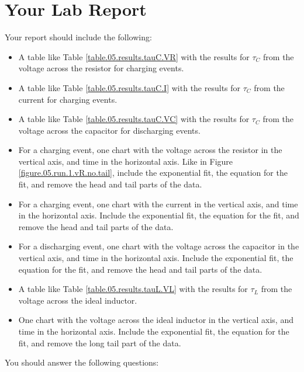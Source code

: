 \section{Your Lab Report}
%
Your report should include the following:
\begin{itemize}
    \item A table like Table \ref{table.05.results.tauC.VR} with the results for $\tau_{C}$ from the voltage across the resistor for charging events.
    \item A table like Table \ref{table.05.results.tauC.I} with the results for $\tau_{C}$ from the current for charging events.
    \item A table like Table \ref{table.05.results.tauC.VC} with the results for $\tau_{C}$ from the voltage across the capacitor for discharging events.
    \item For a charging event, one chart with the voltage across the resistor in the vertical axis, and time in the horizontal axis. Like in Figure \ref{figure.05.run.1.vR.no.tail}, include the exponential fit, the equation for the fit, and remove the head and tail parts of the data.
    \item For a charging event, one chart with the current in the vertical axis, and time in the horizontal axis. Include the exponential fit, the equation for the fit, and remove the head and tail parts of the data.
    \item For a discharging event, one chart with the voltage across the capacitor in the vertical axis, and time in the horizontal axis. Include the exponential fit, the equation for the fit, and remove the head and tail parts of the data.
    \item A table like Table \ref{table.05.results.tauL.VL} with the results for $\tau_{L}$ from the voltage across the ideal inductor.
    \item One chart with the voltage across the ideal inductor in the vertical axis, and time in the horizontal axis. Include the exponential fit, the equation for the fit, and remove the long tail part of the data.
\end{itemize}
You should answer the following questions:
